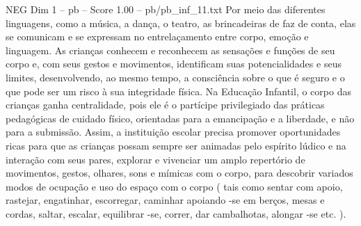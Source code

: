 \begin{textsample}{NEG Dim 1 – pb – Score 1.00 – pb/pb\_inf\_11.txt}
Por meio das diferentes linguagens, como a música, a dança, o teatro, as brincadeiras de faz de conta, elas se comunicam e se expressam no entrelaçamento entre corpo, emoção e linguagem.
As crianças conhecem e reconhecem as sensações e funções de seu corpo e, com seus gestos e movimentos, identificam suas potencialidades e seus limites, desenvolvendo, ao mesmo tempo, a consciência sobre o que é seguro e o que pode ser um risco à sua integridade física.
Na Educação Infantil, o corpo das crianças ganha centralidade, pois ele é o partícipe privilegiado das práticas pedagógicas de cuidado físico, orientadas para a emancipação e a liberdade, e não para a submissão.
Assim, a instituição escolar precisa promover oportunidades ricas para que as crianças possam sempre ser animadas pelo espírito lúdico e na interação com seus pares, explorar e vivenciar um amplo repertório de movimentos, gestos, olhares, sons e mímicas com o corpo, para descobrir variados modos de ocupação e uso do espaço com o corpo ( tais como sentar com apoio, rastejar, engatinhar, escorregar, caminhar apoiando -se em berços, mesas e cordas, saltar, escalar, equilibrar -se, correr, dar cambalhotas, alongar -se etc. ).

\end{textsample}
